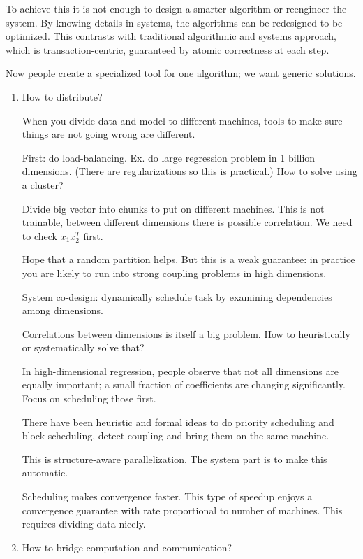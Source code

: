To achieve this it is not enough to design a smarter algorithm or reengineer the system. By knowing details in systems, the algorithms can be redesigned to be optimized. This contrasts with traditional algorithmic and systems approach, which is transaction-centric, guaranteed by atomic correctness at each step.

Now people create a specialized tool for one algorithm; we want generic solutions.

\begin{enumerate}
\item
How to distribute?

When you divide data and model to different machines, tools to make sure things are not going wrong are different.

First: do load-balancing. Ex. do large regression problem in 1 billion dimensions. (There are regularizations so this is practical.) How to solve using a cluster? 

Divide big vector into chunks to put on different machines. This is not trainable, between different dimensions there is possible correlation. %
We need to check $x_1x_2^T$ first.

Hope that a random partition helps. But this is a weak guarantee: in practice you are likely to run into strong coupling problems in high dimensions.

System co-design: dynamically schedule task by examining dependencies among dimensions. 

Correlations between dimensions is itself a big problem. How to heuristically or systematically solve that? 

In high-dimensional regression, people observe that not all dimensions are equally important; a small fraction of coefficients are changing significantly. Focus on scheduling those first. %

There have been heuristic and formal ideas to do priority scheduling and block scheduling, detect coupling and bring them on the same machine. 

This is structure-aware parallelization. The system part is to make this automatic. 

Scheduling makes convergence faster. 
This type of speedup enjoys a convergence guarantee with rate proportional to number of machines. This requires dividing data nicely. 
\item
How to bridge computation and communication?


\end{enumerate}
